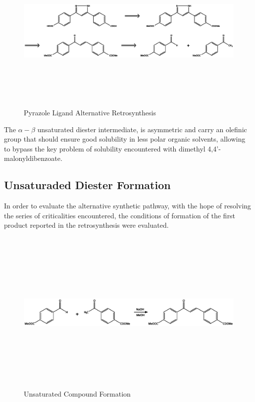 \documentclass[../Master.tex]{subfiles}
\begin{document}
\begin{figure}[h!]
	\centering
	\includegraphics[width=16cm,height=8cm,keepaspectratio]{Structures/pyrazole-retro-alt.eps}
	\caption{Pyrazole Ligand Alternative Retrosynthesis}\label{fig:pyrazole-retro-alt}
\end{figure}

The \(\alpha-\beta\) unsaturated diester intermediate, is asymmetric and carry an olefinic group that should ensure good solubility in less polar organic solvents, allowing to bypass the key problem of solubility encountered with dimethyl 4,4’-malonyldibenzoate.

\subsection{Unsaturaded Diester Formation}\label{sec:alt-pyr-diest}

In order to evaluate the alternative synthetic pathway, with the hope of resolving the series of criticalities encountered, the conditions of formation of the first product reported in the retrosynthesis were evaluated.

\begin{figure}[h!]
	\centering
	\includegraphics[width=13cm,height=8cm,keepaspectratio]{Structures/unsaturated-synt.eps}
	\caption{Unsaturated Compound Formation}
\end{figure}
\end{document}
